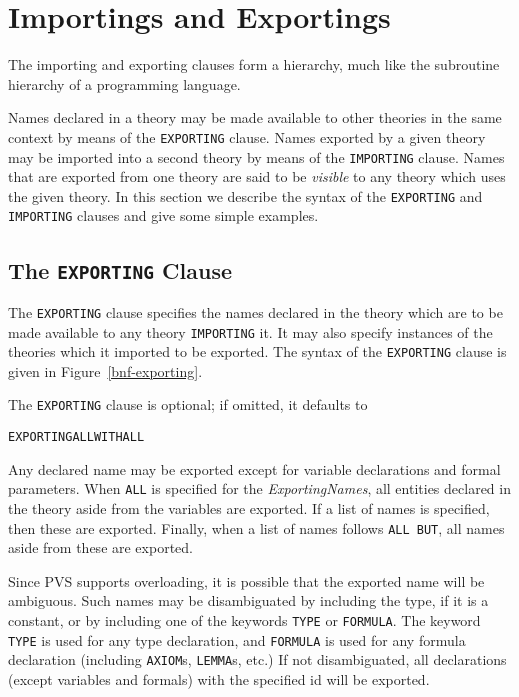 

\section{Importings and Exportings}\label{importings}

The importing and exporting clauses form a hierarchy, much like the
subroutine hierarchy of a programming language.

Names declared in a theory may be made available to other theories in the
same context by means of the \texttt{EXPORTING} clause.  Names exported by
a given theory may be imported into a second theory by means of the
\texttt{IMPORTING} clause.  Names that are exported from one theory are
said to be \emph{visible} to any theory which uses the given theory.  In
this section we describe the syntax of the \texttt{EXPORTING} and
\texttt{IMPORTING} clauses and give some simple examples.



\subsection{The \texttt{EXPORTING} Clause}

The \texttt{EXPORTING} clause specifies the names declared in the theory
which are to be made available to any theory \texttt{IMPORTING} it.  It may
also specify instances of the theories which it imported to be exported.
The syntax of the \texttt{EXPORTING} clause is given in
Figure~\ref{bnf-exporting}.

\noindent
The \texttt{EXPORTING} clause is optional; if omitted, it defaults to
\begin{alltt}
  EXPORTING ALL WITH ALL
\end{alltt}

Any declared name may be exported except for variable declarations and formal parameters.
When \texttt{ALL} is specified for the \emph{ExportingNames}, all
entities declared in the theory aside from the variables are exported.
If a list of names is specified, then these are exported.  Finally, when
a list of names follows \texttt{ALL BUT}, all names aside from these are exported.

Since PVS supports overloading, it is possible that the exported name will
be ambiguous.  Such names may be disambiguated by including the type, if
it is a constant, or by including one of the keywords \texttt{TYPE} or
\texttt{FORMULA}.  The keyword \texttt{TYPE} is used for any type
declaration, and \texttt{FORMULA} is used for any formula declaration
(including \texttt{AXIOM}s, \texttt{LEMMA}s, etc.)  If not disambiguated,
all declarations (except variables and formals) with the specified id will
be exported.

